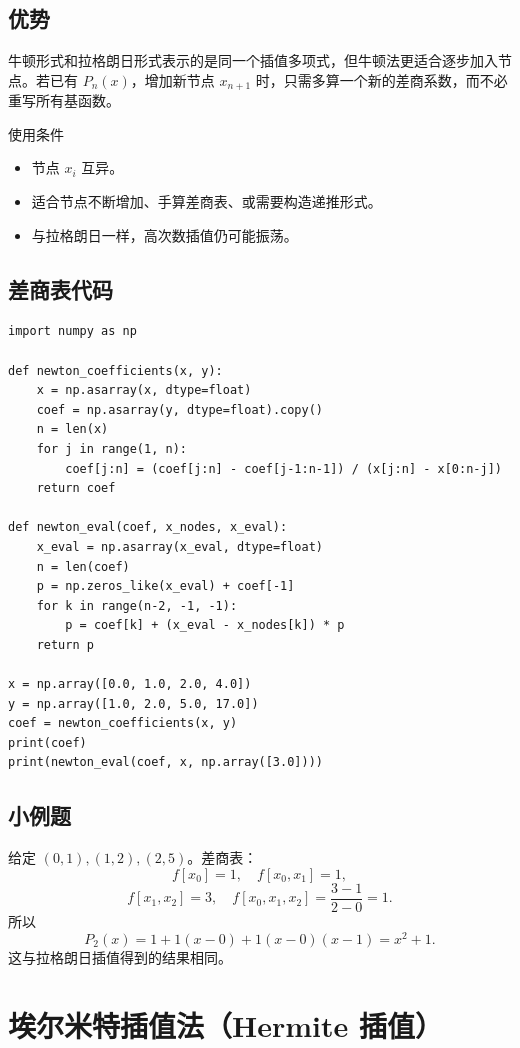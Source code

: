 \documentclass[11pt,a4paper]{ctexart}
\begin{document}
\subsection{优势}

牛顿形式和拉格朗日形式表示的是同一个插值多项式，但牛顿法更适合逐步加入节点。若已有 $P_n(x)$，增加新节点 $x_{n+1}$ 时，只需多算一个新的差商系数，而不必重写所有基函数。

\begin{keybox}{使用条件}
\begin{itemize}
  \item 节点 $x_i$ 互异。
  \item 适合节点不断增加、手算差商表、或需要构造递推形式。
  \item 与拉格朗日一样，高次数插值仍可能振荡。
\end{itemize}
\end{keybox}

\subsection{差商表代码}

\begin{lstlisting}
import numpy as np

def newton_coefficients(x, y):
    x = np.asarray(x, dtype=float)
    coef = np.asarray(y, dtype=float).copy()
    n = len(x)
    for j in range(1, n):
        coef[j:n] = (coef[j:n] - coef[j-1:n-1]) / (x[j:n] - x[0:n-j])
    return coef

def newton_eval(coef, x_nodes, x_eval):
    x_eval = np.asarray(x_eval, dtype=float)
    n = len(coef)
    p = np.zeros_like(x_eval) + coef[-1]
    for k in range(n-2, -1, -1):
        p = coef[k] + (x_eval - x_nodes[k]) * p
    return p

x = np.array([0.0, 1.0, 2.0, 4.0])
y = np.array([1.0, 2.0, 5.0, 17.0])
coef = newton_coefficients(x, y)
print(coef)
print(newton_eval(coef, x, np.array([3.0])))
\end{lstlisting}

\subsection{小例题}

给定 $(0,1),(1,2),(2,5)$。差商表：
\[
f[x_0]=1,\quad f[x_0,x_1]=1,
\]
\[
f[x_1,x_2]=3,\quad f[x_0,x_1,x_2]=\frac{3-1}{2-0}=1.
\]
所以
\[
P_2(x)=1+1(x-0)+1(x-0)(x-1)=x^2+1.
\]
这与拉格朗日插值得到的结果相同。

\newpage
\section{埃尔米特插值法（Hermite 插值）}
\end{document}
